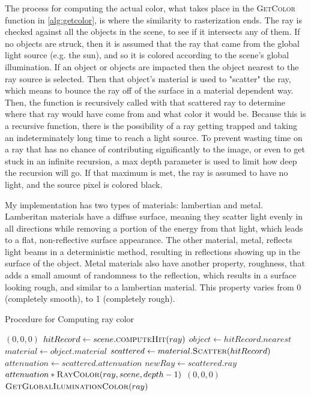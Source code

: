 \documentclass[10pt]{IEEEtran}
\begin{document}
The process for computing the actual color, what takes place in the \textsc{GetColor} function in
\cref{alg:getcolor}, is where the similarity to rasterization ends. The ray is checked against all
the objects in the scene, to see if it intersects any of them. If no objects are struck, then it is
assumed that the ray that came from the global light source (e.g. the sun), and so it is colored
according to the scene's global illumination. If an object or objects are impacted then the object
nearest to the ray source is selected. Then that object's material is used to "scatter" the ray,
which means to bounce the ray off of the surface in a material dependent way. Then, the function is
recursively called with that scattered ray to determine where that ray would have come from and what
color it would be. Because this is a recursive function, there is the possibility of a ray getting
trapped and taking an indeterminately long time to reach a light source. To prevent wasting time on
a ray that has no chance of contributing significantly to the image, or even to get stuck in an
infinite recursion, a max depth parameter is used to limit how deep the recursion will go. If that
maximum is met, the ray is assumed to have no light, and the source pixel is colored black.

My implementation has two types of materials: lambertian and metal. Lamberitan materials have a
diffuse surface, meaning they scatter light evenly in all directions while removing a portion of the
energy from that light, which leads to a flat, non-reflective surface appearance. The other
material, metal, reflects light beams in a deterministic method, resulting in reflections showing up
in the surface of the object. Metal materials also have another property, roughness, that adds a
small amount of randomness to the reflection, which results in a surface looking rough, and similar
to a lambertian material. This property varies from 0 (completely smooth), to 1 (completely rough).

\begin{algorithm}[b]
    \caption{Procedure for Computing ray color}\label{alg:getcolor}
    \scriptsize
    \begin{algorithmic}[1]
            \State \Return $(0,0,0)$
        \EndIf
        \State $hitRecord \gets scene.\textsc{computeHit}(ray)$
            \State $object\gets hitRecord.nearest$
            \State $material \gets object.material$
            \State $scattered \gets material.\textsc{Scatter}(hitRecord)$
                \State $attenuation\gets scattered.attenuation$
                \State $newRay \gets scattered.ray$
                \State \Return $attenuation * \textsc{RayColor}(ray, scene, depth-1)$
                \Else
                \State \Return $(0, 0, 0)$
            \EndIf
        \Else
        \State \Return $\textsc{GetGlobalIluminationColor}(ray)$
        \EndIf
        \EndProcedure
    \end{algorithmic}
\end{algorithm}
\end{document}
